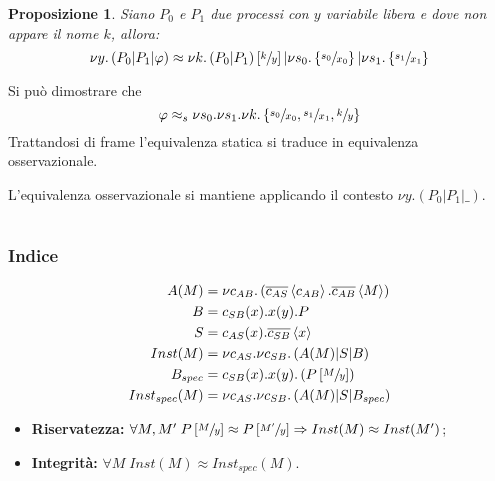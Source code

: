 \documentclass{beamer}
\newcounter{counter1}
\theoremstyle{plain}
\newtheorem{mypro}[counter1]{Proposizione}
\theoremstyle{definition}
\theoremstyle{remark}
\newcommand{\obar}[1]{\overline{#1}}
\newcommand{\set}[1]{\left\{#1\right\}}
\newcommand{\pa}[1]{\left(#1\right)}
\newcommand{\ang}[1]{\left<#1\right>}
\newcommand{\bra}[1]{\left[#1\right]}
\begin{document}
\begin{frame}
  \begin{mypro}
    Siano $P_0$ e $P_1$ due processi con $y$ variabile libera e dove non
    appare il nome $k$, allora:
    \[ \nu y.\pa{ P_0 | P_1 | \varphi } \approx \nu k.\pa{ P_0|P_1 }
        \bra{\sfrac{k}{y}} | \nu s_0. \set{\sfrac{s_0}{x_0}} | \nu
      s_1.\set{\sfrac{s_1}{x_1}} \]
  \end{mypro}
  
  Si pu\`o dimostrare che
  \[ \varphi \approx _s \nu s_0.\nu s_1.\nu k.\set{\sfrac{s_0}{x_0},
      \sfrac{s_1}{x_1}, \sfrac{k}{y}} \]
  Trattandosi di frame l'equivalenza statica si traduce in equivalenza
  osservazionale.

  L'equivalenza osservazionale si mantiene applicando il contesto $\nu
  y.\pa{ P_0 | P_1 | \_ }$.
\end{frame}

\section*{}

\begin{frame}[plain]
 \frametitle{Indice}
 \tableofcontents
\end{frame}


\begin{frame}
  \begin{align*}
    A(M) & = \nu
           c_{AB}. \pa{\obar{c_{AS}}\ang{c_{AB}}. \obar{c_{AB}}\ang{M}}
    \\
    B & = c_{SB}(x). x(y) .P \\
    S & = c_{AS}(x) . \obar{c_{SB}} \ang{x} \\
    Inst(M) & = \nu c_{AS}. \nu c_{SB}. \pa{ A(M) | S | B} \\
    B_{spec} & = c_{SB}(x). x(y). \pa{ P\bra{\sfrac{M}{y}}} \\ 
    Inst_{spec}(M) & = \nu c_{AS}. \nu c_{SB}. \pa{ A(M) | S | B_{spec}}
  \end{align*}
  \begin{itemize}
  \item \textbf{Riservatezza:} $\forall M,M'\; P\bra{\sfrac{M}{y}}
    \approx P\bra{\sfrac{M'}{y}} \Rightarrow Inst(M) \approx Inst(M')$;
  \item \textbf{Integrit\`a:} $\forall M \; Inst(M) \approx
    Inst_{spec}(M)$.
  \end{itemize}
\end{frame}
\end{document}
